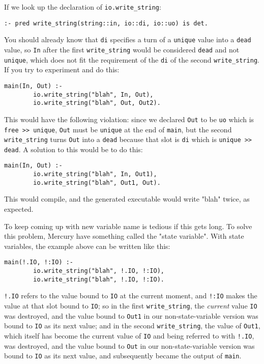 If we look up the declaration of \texttt{io.write\_string}:

\begin{lstlisting}[language=Mercury]
	:- pred write_string(string::in, io::di, io::uo) is det.
\end{lstlisting}

You should already know that \texttt{di} specifies a turn of a \texttt{unique} value into a \texttt{dead} value, so \texttt{In} after the first \texttt{write\_string} would be considered \texttt{dead} and not \texttt{unique}, which does not fit the requirement of the \texttt{di} of the second \texttt{write\_string}. If you try to experiment and do this:

\begin{lstlisting}[language=Mercury]
	main(In, Out) :-
	    io.write_string("blah", In, Out),
	    io.write_string("blah", Out, Out2).
\end{lstlisting}

This would have the following violation: since we declared \texttt{Out} to be \texttt{uo} which is \texttt{free >{}>{} unique}, \texttt{Out} must be \texttt{unique} at the end of \texttt{main}, but the second \texttt{write\_string} turns \texttt{Out} into a \texttt{dead} because that slot is \texttt{di} which is \texttt{unique >{}>{} dead}. A solution to this would be to do this:

\begin{lstlisting}[language=Mercury]
	main(In, Out) :-
	    io.write_string("blah", In, Out1),
	    io.write_string("blah", Out1, Out).
\end{lstlisting}

This would compile, and the generated executable would write "blah" twice, as expected.

To keep coming up with new variable name is tedious if this gets long. To solve this problem, Mercury have something called the "state variable". With state variables, the example above can be written like this:

\begin{lstlisting}[language=Mercury]
	main(!.IO, !:IO) :-
	    io.write_string("blah", !.IO, !:IO),
	    io.write_string("blah", !.IO, !:IO).
\end{lstlisting}

\texttt{!.IO} refers to the value bound to \texttt{IO} at the current moment, and \texttt{!:IO} makes the value at that slot bound to \texttt{IO}; so in the first \texttt{write\_string}, the \emph{current} value \texttt{IO} was destroyed, and the value bound to \texttt{Out1} in our non-state-variable version was bound to \texttt{IO} as its next value; and in the second \texttt{write\_string}, the value of \texttt{Out1}, which itself has become the current value of \texttt{IO} and being referred to with \texttt{!.IO}, was destroyed, and the value bound to \texttt{Out} in our non-state-variable version was bound to \texttt{IO} as its next value, and subsequently became the output of \texttt{main}.

